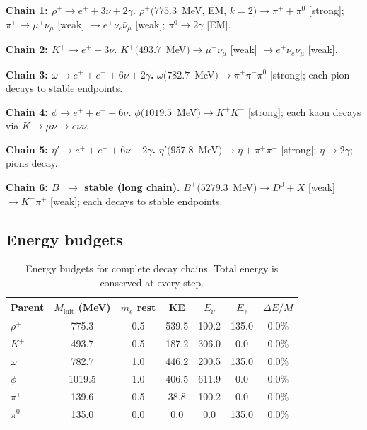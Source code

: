 \documentclass[11pt,a4paper]{article}
\begin{document}
\medskip
\noindent\textbf{Chain 1: $\rho^+ \to e^+ + 3\nu + 2\gamma$.}
$\rho^+(775.3$~MeV, EM, $k{=}2) \to \pi^+ + \pi^0$ [strong]; $\pi^+ \to \mu^+\nu_\mu$ [weak] $\to e^+\nu_e\bar\nu_\mu$ [weak]; $\pi^0 \to 2\gamma$ [EM].

\medskip
\noindent\textbf{Chain 2: $K^+ \to e^+ + 3\nu$.}
$K^+(493.7$~MeV$) \to \mu^+\nu_\mu$ [weak] $\to e^+\nu_e\bar\nu_\mu$ [weak].

\medskip
\noindent\textbf{Chain 3: $\omega \to e^+ + e^- + 6\nu + 2\gamma$.}
$\omega(782.7$~MeV$) \to \pi^+\pi^-\pi^0$ [strong]; each pion decays to stable endpoints.

\medskip
\noindent\textbf{Chain 4: $\phi \to e^+ + e^- + 6\nu$.}
$\phi(1019.5$~MeV$) \to K^+K^-$ [strong]; each kaon decays via $K \to \mu\nu \to e\nu\nu$.

\medskip
\noindent\textbf{Chain 5: $\eta' \to e^+ + e^- + 6\nu + 2\gamma$.}
$\eta'(957.8$~MeV$) \to \eta + \pi^+\pi^-$ [strong]; $\eta \to 2\gamma$; pions decay.

\medskip
\noindent\textbf{Chain 6: $B^+ \to$ stable (long chain).}
$B^+(5279.3$~MeV$) \to D^0 + X$ [weak] $\to K^-\pi^+$ [weak]; each decays to stable endpoints.

\subsection{Energy budgets}

\begin{table}[h]
\centering
\caption{Energy budgets for complete decay chains. Total energy is conserved at every step.}
\label{tab:energy-budgets}
\small
\begin{tabular}{@{}lcccccc@{}}
\toprule
Parent & $M_{\text{init}}$ (MeV) & $m_e$ rest & KE & $E_\nu$ & $E_\gamma$ & $\Delta E/M$ \\
\midrule
$\rho^+$ & 775.3 & 0.5 & 539.5 & 100.2 & 135.0 & 0.0\% \\
$K^+$ & 493.7 & 0.5 & 187.2 & 306.0 & 0.0 & 0.0\% \\
$\omega$ & 782.7 & 1.0 & 446.2 & 200.5 & 135.0 & 0.0\% \\
$\phi$ & 1019.5 & 1.0 & 406.5 & 611.9 & 0.0 & 0.0\% \\
$\pi^+$ & 139.6 & 0.5 & 38.8 & 100.2 & 0.0 & 0.0\% \\
$\pi^0$ & 135.0 & 0.0 & 0.0 & 0.0 & 135.0 & 0.0\% \\
\bottomrule
\end{tabular}
\end{table}
\end{document}
